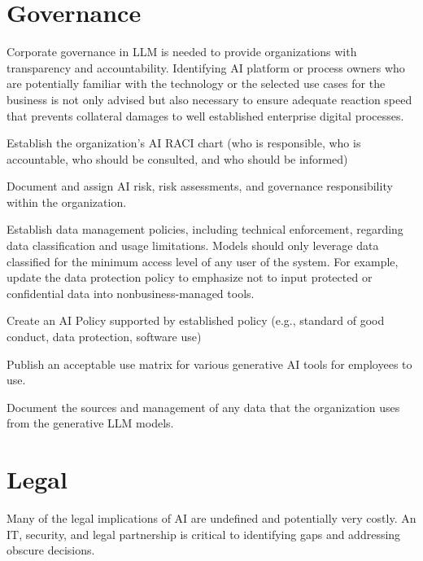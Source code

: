 \clearpage

\section{Governance}
Corporate governance in LLM is needed to provide organizations with
transparency and accountability. Identifying AI platform or process owners
who are potentially familiar with the technology or the selected use cases
for the business is not only advised but also necessary to ensure adequate
reaction speed that prevents collateral damages to well established enterprise
digital processes.

\begin{minipage}{\linewidth}
\begin{checklist}
  \item Establish the organization’s AI RACI chart (who is responsible, who is
  accountable, who should be consulted, and who should be informed)
  \item Document and assign AI risk, risk assessments, and governance
  responsibility within the organization.
  \item Establish data management policies, including technical enforcement,
  regarding data classification and usage limitations. Models should only
  leverage data classified for the minimum access level of any user of the
  system. For example, update the data protection policy to emphasize not to
  input protected or confidential data into nonbusiness-managed tools.
  \item Create an AI Policy supported by established policy (e.g., standard of
  good conduct, data protection, software use)
  \item Publish an acceptable use matrix for various generative AI tools for
  employees to use.
  \item Document the sources and management of any data that the organization
  uses from the generative LLM models.
\end{checklist}
\end{minipage}

\clearpage

\section{Legal}
Many of the legal implications of AI are undefined and potentially very costly.
An IT, security, and legal partnership is critical to identifying gaps and
addressing obscure decisions.

